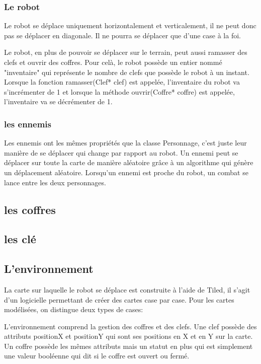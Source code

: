 \documentclass[a4paper 12pts]{article}
\begin{document}
\subsubsection{Le robot}
Le robot se déplace uniquement horizontalement et verticalement, il ne peut donc pas se déplacer en diagonale. 
Il ne pourra se déplacer que d'une case à la foi.


Le robot, en plus de pouvoir se déplacer sur le terrain, peut aussi ramasser des clefs et ouvrir des coffres.
Pour celà, le robot possède un entier nommé "inventaire" qui représente le nombre de clefs que possède le robot à un instant.
Lorsque la fonction ramasser(Clef* clef) est appelée, l'inventaire du robot va s'incrémenter de 1 et lorsque la méthode ouvrir(Coffre* coffre)
est appelée, l'inventaire va se décrémenter de 1.



\subsubsection{les ennemis}

Les ennemis ont les mêmes propriétés que la classe Personnage, c'est juste leur manière de se déplacer qui change par rapport au robot. 
Un ennemi peut se déplacer sur toute la carte de manière aléatoire grâce à un algorithme qui génère un déplacement aléatoire.
Lorsqu'un ennemi est proche du robot, un combat se lance entre les deux personnages.

\subsection{les coffres}

\subsection{les clé}

\subsection{L'environnement}
La carte sur laquelle le robot se déplace est construite à l'aide de Tiled, il s'agit d'un logicielle permettant de créer des cartes case par case. 
Pour les cartes modélisées, on distingue deux types de cases:

L'environnement comprend la gestion des coffres et des clefs.
Une clef possède des attributs positionX et positionY qui sont ses positions en X et en Y sur la carte. 
Un coffre possède les mêmes attributs mais un statut en plus qui est simplement une valeur booléenne qui dit si le coffre est ouvert ou fermé.
\end{document}
